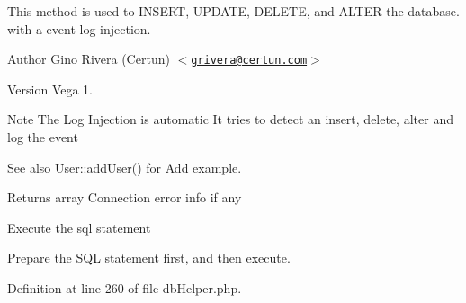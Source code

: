 \-This method is used to \-I\-N\-S\-E\-R\-T, \-U\-P\-D\-A\-T\-E, \-D\-E\-L\-E\-T\-E, and \-A\-L\-T\-E\-R the database. with a event log injection.

\begin{DoxyAuthor}{\-Author}
\-Gino \-Rivera (\-Certun) $<$\href{mailto:grivera@certun.com}{\tt grivera@certun.\-com}$>$ 
\end{DoxyAuthor}
\begin{DoxyVersion}{\-Version}
\-Vega 1.
\end{DoxyVersion}
\begin{DoxyNote}{\-Note}
\-The \-Log \-Injection is automatic \-It tries to detect an insert, delete, alter and log the event
\end{DoxyNote}
\begin{DoxySeeAlso}{\-See also}
\hyperlink{class_user_a8dfbe73a90ecf4cdec6b3229da0ee2f8}{\-User\-::add\-User()} for \-Add example.
\end{DoxySeeAlso}
\begin{DoxyReturn}{\-Returns}
array \-Connection error info if any 
\end{DoxyReturn}
\-Execute the sql statement

\-Prepare the \-S\-Q\-L statement first, and then execute.

\-Definition at line 260 of file db\-Helper.\-php.


